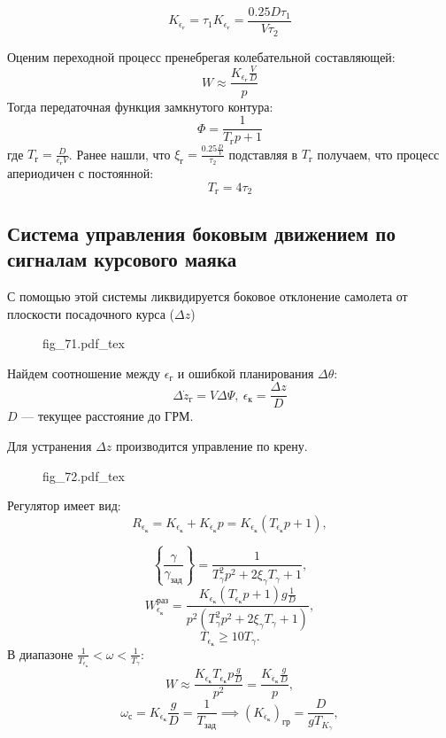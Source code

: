 \documentclass{article}
\newcommand{\incfig}[1]{
    {#1.pdf_tex}
}
\begin{document}
\[
    K_{\dot{\epsilon}_{\text{г}}} = \tau_1 K_{\epsilon_\text{г}} = \frac{0.25 D
    \tau_1}{V \tau_2}
\]

Оценим переходной процесс пренебрегая колебательной составляющей:
\[
    W \approx \frac{K_{\epsilon_\text{г}} \frac{V}{D}}{p}
\]
Тогда передаточная функция замкнутого контура:
\[
    \Phi = \frac{1}{T_\text{г} p + 1}
\]
где $T_\text{г} = \frac{D}{\epsilon_\text{г} V}$.
Ранее нашли, что $\xi_\text{г} = \frac{0.25 \frac{D}{V}}{\tau_2}$ подставляя в
$T_\text{г}$ получаем, что процесс апериодичен с постоянной:
\[
    T_\text{г} = 4 \tau_2
\]

\subsection{Система управления боковым движением по сигналам курсового маяка}
С помощью этой системы ликвидируется боковое отклонение самолета от плоскости
посадочного курса ($\Delta z$)
\begin{figure}[H]
    \centering
    \incfig{fig_71}
    \label{fig:fig_71}
\end{figure}
Найдем соотношение между $\epsilon_\text{г}$ и ошибкой планирования $\Delta
\theta$:
\[
    \Delta \dot{z}_\text{г} = V \Delta \Psi, \ \epsilon_\text{к} = \frac{\Delta
    z}{D}
\]
$D$ --- текущее расстояние до ГРМ.

Для устранения $\Delta z$ производится управление по крену.
\begin{figure}[H]
    \centering
    \incfig{fig_72}
    \label{fig:fig_72}
\end{figure}
Регулятор имеет вид:
\[
    R_{\epsilon_\text{к}} = K_{\epsilon_\text{к}} +
    K_{\dot{\epsilon}_{\text{к}}} p =
    K_{\epsilon_\text{к}}(T_{\epsilon_\text{к}} p + 1),
\]

\[
    \left\{ \frac{\gamma}{\gamma_\text{зад}} \right\} = \frac{1}{ T_\gamma^2
    p^2 + 2 \xi_\gamma T_\gamma + 1},
\]
\[
    W_{\epsilon_\text{к}}^\text{раз} = \frac{K_{\epsilon_\text{к}}
    (T_{\epsilon_\text{к}} p + 1) g \frac{1}{D}}{ p^2 ( T_\gamma^2 p^2 + 2
\xi_\gamma T_\gamma + 1)},
\]
\[
    T_{\epsilon_\text{к}} \ge 10 T_\gamma.
\]
В диапазоне $\frac{1}{T_{\epsilon_\text{к}}} < \omega < \frac{1}{T_\gamma}$:
\[
    W \approx \frac{K_{\epsilon_\text{к}} T_{\epsilon_\text{к}} p
    \frac{g}{D}}{p^2} = \frac{K_{\dot{\epsilon}_{\text{к}}} \frac{g}{D}}{p},
\]
\[
    \omega_{\text{с}} = K_{\dot{\epsilon}_{\text{к}}} \frac{g}{D} =
    \frac{1}{T_{\text{зад}}} \implies
    (K_{\dot{\epsilon}_{\text{к}}})_{\text{гр}} = \frac{D}{g T_{K_{\gamma}}} ,
\]
\end{document}
